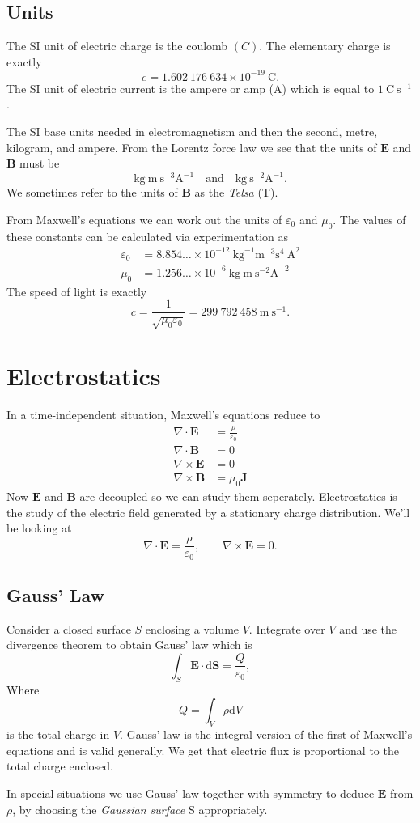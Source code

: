 \documentclass{article}
\begin{document}
\subsection{Units}
The SI unit of electric charge is the coulomb $ (C) $. The elementary charge is exactly
\[
	e=1.602\ 176\ 634\times 10^{-19}\ \text{C}.
\]
The SI unit of electric current is the ampere or amp (A) which is equal to $ 1\ \text{C}\ \text{s}^{-1} $.\par
The SI base units needed in electromagnetism and then the second, metre, kilogram, and ampere. From the Lorentz force law we see that the units of $ \mathbf E $ and $ \mathbf B $ must be
\[
	\text{kg}\ \text{m}\ \text{s}^{-3}\text{A}^{-1}\quad \text{and}\quad \text{kg}\ \text{s}^{-2}\text{A}^{-1}.
\]
We sometimes refer to the units of $ \mathbf B $ as the \textit{Telsa} (T).\par
From Maxwell's equations we can work out the units of $ \varepsilon_0 $ and $ \mu_0 $. The values of these constants can be calculated via experimentation as
\begin{align*}
	\varepsilon_0 &= 8.854\dots\times 10^{-12}\ \text{kg}^{-1}\text{m}^{-3}\text{s}^4\ \text{A}^2\\
	\mu_0 &= 1.256\dots\times 10^{-6}\ \text{kg}\ \text{m}\ \text{s}^{-2}\text{A}^{-2}
\end{align*}
The speed of light is exactly
\[
	c=\frac{1}{\sqrt{\mu_0\varepsilon_0}}=299\ 792\ 458\ \text{m}\ \text{s}^{-1}.
\]
\section{Electrostatics}
In a time-independent situation, Maxwell's equations reduce to
\begin{align*}
	\nabla\cdot\mathbf E &= \frac \rho{\varepsilon_0}\\
	\nabla \cdot \mathbf B &= 0 \\
	\nabla \times \mathbf E &= 0 \\
	\nabla \times \mathbf B &= \mu_0 \mathbf J
\end{align*}
Now $ \mathbf E $ and $ \mathbf B $ are decoupled so we can study them seperately. Electrostatics is the study of the electric field generated by a stationary charge distribution. We'll be looking at
\[
	\nabla\cdot \mathbf E = \frac\rho{\varepsilon_0},\qquad \nabla\times \mathbf E = 0.
\]
\subsection{Gauss' Law}
Consider a closed surface $ S $ enclosing a volume $ V $. Integrate over $ V $ and use the divergence theorem to obtain Gauss' law which is
\[
		\int_S \mathbf E\cdot \mathrm d\mathbf S = \frac{Q}{\varepsilon_0},
\]
Where
\[
  Q = \int_V \rho\mathrm dV
\]
is the total charge in $ V $. Gauss' law is the integral version of the first of Maxwell's equations and is valid generally. We get that electric flux is proportional to the total charge enclosed.\par
In special situations we use Gauss' law together with symmetry to deduce $ \mathbf E $ from $ \rho $, by choosing the \textit{Gaussian surface} S appropriately.
\end{document}
